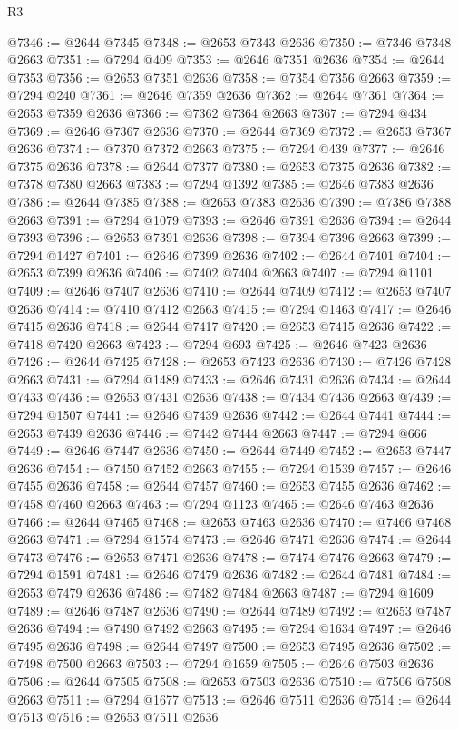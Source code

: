 \begin{lexlean}{R3}
\begin{coremodule}
@7346 := @2644 @7345
@7348 := @2653 @7343 @2636
@7350 := @7346 @7348 @2663
@7351 := @7294 @409
@7353 := @2646 @7351 @2636
@7354 := @2644 @7353
@7356 := @2653 @7351 @2636
@7358 := @7354 @7356 @2663
@7359 := @7294 @240
@7361 := @2646 @7359 @2636
@7362 := @2644 @7361
@7364 := @2653 @7359 @2636
@7366 := @7362 @7364 @2663
@7367 := @7294 @434
@7369 := @2646 @7367 @2636
@7370 := @2644 @7369
@7372 := @2653 @7367 @2636
@7374 := @7370 @7372 @2663
@7375 := @7294 @439
@7377 := @2646 @7375 @2636
@7378 := @2644 @7377
@7380 := @2653 @7375 @2636
@7382 := @7378 @7380 @2663
@7383 := @7294 @1392
@7385 := @2646 @7383 @2636
@7386 := @2644 @7385
@7388 := @2653 @7383 @2636
@7390 := @7386 @7388 @2663
@7391 := @7294 @1079
@7393 := @2646 @7391 @2636
@7394 := @2644 @7393
@7396 := @2653 @7391 @2636
@7398 := @7394 @7396 @2663
@7399 := @7294 @1427
@7401 := @2646 @7399 @2636
@7402 := @2644 @7401
@7404 := @2653 @7399 @2636
@7406 := @7402 @7404 @2663
@7407 := @7294 @1101
@7409 := @2646 @7407 @2636
@7410 := @2644 @7409
@7412 := @2653 @7407 @2636
@7414 := @7410 @7412 @2663
@7415 := @7294 @1463
@7417 := @2646 @7415 @2636
@7418 := @2644 @7417
@7420 := @2653 @7415 @2636
@7422 := @7418 @7420 @2663
@7423 := @7294 @693
@7425 := @2646 @7423 @2636
@7426 := @2644 @7425
@7428 := @2653 @7423 @2636
@7430 := @7426 @7428 @2663
@7431 := @7294 @1489
@7433 := @2646 @7431 @2636
@7434 := @2644 @7433
@7436 := @2653 @7431 @2636
@7438 := @7434 @7436 @2663
@7439 := @7294 @1507
@7441 := @2646 @7439 @2636
@7442 := @2644 @7441
@7444 := @2653 @7439 @2636
@7446 := @7442 @7444 @2663
@7447 := @7294 @666
@7449 := @2646 @7447 @2636
@7450 := @2644 @7449
@7452 := @2653 @7447 @2636
@7454 := @7450 @7452 @2663
@7455 := @7294 @1539
@7457 := @2646 @7455 @2636
@7458 := @2644 @7457
@7460 := @2653 @7455 @2636
@7462 := @7458 @7460 @2663
@7463 := @7294 @1123
@7465 := @2646 @7463 @2636
@7466 := @2644 @7465
@7468 := @2653 @7463 @2636
@7470 := @7466 @7468 @2663
@7471 := @7294 @1574
@7473 := @2646 @7471 @2636
@7474 := @2644 @7473
@7476 := @2653 @7471 @2636
@7478 := @7474 @7476 @2663
@7479 := @7294 @1591
@7481 := @2646 @7479 @2636
@7482 := @2644 @7481
@7484 := @2653 @7479 @2636
@7486 := @7482 @7484 @2663
@7487 := @7294 @1609
@7489 := @2646 @7487 @2636
@7490 := @2644 @7489
@7492 := @2653 @7487 @2636
@7494 := @7490 @7492 @2663
@7495 := @7294 @1634
@7497 := @2646 @7495 @2636
@7498 := @2644 @7497
@7500 := @2653 @7495 @2636
@7502 := @7498 @7500 @2663
@7503 := @7294 @1659
@7505 := @2646 @7503 @2636
@7506 := @2644 @7505
@7508 := @2653 @7503 @2636
@7510 := @7506 @7508 @2663
@7511 := @7294 @1677
@7513 := @2646 @7511 @2636
@7514 := @2644 @7513
@7516 := @2653 @7511 @2636

\end{coremodule}
\end{lexlean}

